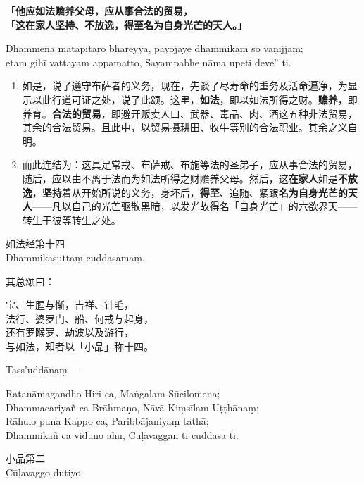 \textbf{「他应如法赡养父母，应从事合法的贸易，\\}
\textbf{「这在家人坚持、不放逸，得至名为自身光芒的天人。」}

Dhammena mātāpitaro bhareyya, payojaye dhammikaṃ so vaṇijjaṃ;\\
etaṃ gihī vattayam appamatto, Sayampabhe nāma upeti deve” ti. %

\begin{enumerate}\item 如是，说了遵守布萨者的义务，现在，先谈了尽寿命的重务及活命遍净，为显示以此行道可证之处，说了此颂。这里，\textbf{如法}，即以如法所得之财。\textbf{赡养}，即养育。\textbf{合法的贸易}，即避开贩卖人口、武器、毒品、肉、酒这五种非法贸易，其余的合法贸易。且此中，以贸易摄耕田、牧牛等别的合法职业。其余之义自明。
\item 而此连结为：这具足常戒、布萨戒、布施等法的圣弟子，应从事合法的贸易，随后，应以由不离于法而为如法所得之财赡养父母。然后，这\textbf{在家人}如是\textbf{不放逸}，\textbf{坚持}着从开始所说的义务，身坏后，\textbf{得至}、追随、紧跟\textbf{名为自身光芒的天人}——凡以自己的光芒驱散黑暗，以发光故得名「自身光芒」的六欲界天——转生于彼等转生之处。\end{enumerate}

\begin{center}如法经第十四\\Dhammikasuttaṃ cuddasamaṃ.\end{center}

其总颂曰：

\begin{quoting}宝、生腥与惭，吉祥、针毛，\\法行、婆罗门、船、何戒与起身，\\还有罗睺罗、劫波以及游行，\\与如法，知者以「小品」称十四。\end{quoting}

Tass’uddānaṃ —

\begin{quoting}Ratanāmagandho Hiri ca, Maṅgalaṃ Sūcilomena;\\Dhammacariyañ ca Brāhmaṇo, Nāvā Kiṃsīlam Uṭṭhānaṃ;\\Rāhulo puna Kappo ca, Paribbājaniyaṃ tathā;\\Dhammikañ ca viduno āhu, Cūḷavaggan ti cuddasā ti.\end{quoting}

\begin{center}\vspace{1em}小品第二\\Cūḷavaggo dutiyo.\end{center}

